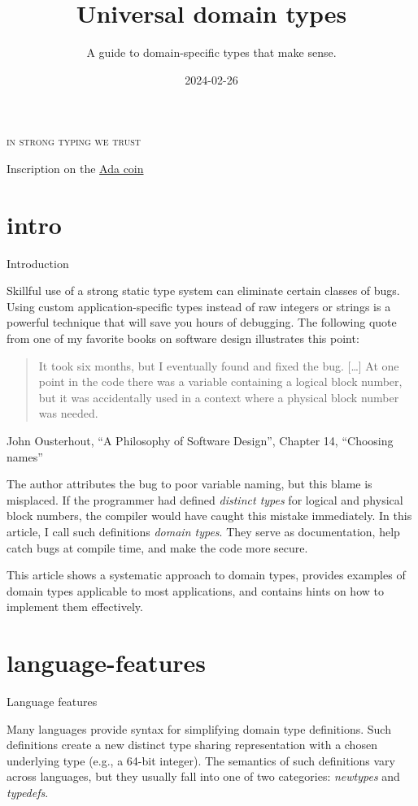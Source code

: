 \documentclass{article}
\title{Universal domain types}
\subtitle{A guide to domain-specific types that make sense.}
\date{2024-02-26}
\begin{document}
\epigraph{
  \textsc{in strong typing we trust}
}{Inscription on the \href{https://people.cs.kuleuven.be/~dirk.craeynest/ada-belgium/pictures/ada-strong.html}{Ada coin}}

\section{intro}{Introduction}

Skillful use of a strong static type system can eliminate certain classes of bugs.
Using custom application-specific types instead of raw integers or strings is a powerful technique that will save you hours of debugging.
The following quote from one of my favorite books on software design illustrates this point:

\blockquote{
  It took six months, but I eventually found and fixed the bug. [\ldots]
  At one point in the code there was a  variable containing a logical block number, but it was accidentally used in a context where a physical block number was needed.
}{John Ousterhout, ``A Philosophy of Software Design'', Chapter 14, ``Choosing names''}

The author attributes the bug to poor variable naming, but this blame is misplaced.
If the programmer had defined \emph{distinct types} for logical and physical block numbers, the compiler would have caught this mistake immediately.
In this article, I call such definitions \emph{domain types}.
They serve as documentation, help catch bugs at compile time, and make the code more secure.

This article shows a systematic approach to domain types, provides examples of domain types applicable to most applications, and contains hints on how to implement them effectively.

\section{language-features}{Language features}

Many languages provide syntax for simplifying domain type definitions.
Such definitions create a new distinct type sharing representation with a chosen underlying type (e.g., a 64-bit integer).
The semantics of such definitions vary across languages, but they usually fall into one of two categories: \emph{newtypes} and \emph{typedefs}.
\end{document}
